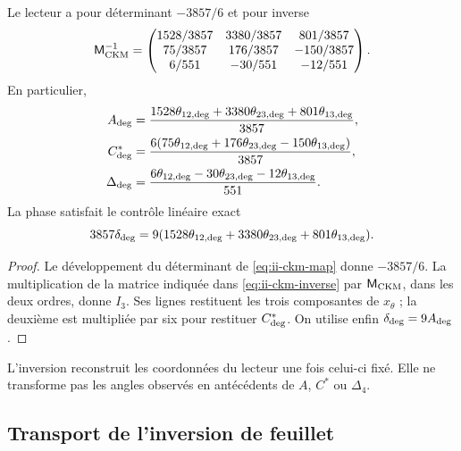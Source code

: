 \begin{proposition}
Le lecteur a pour déterminant \(-3857/6\) et pour inverse
\begin{equation}
 \mathsf M_{\rm CKM}^{-1}=
 \begin{pmatrix}
 1528/3857&3380/3857&801/3857\\
 75/3857&176/3857&-150/3857\\
 6/551&-30/551&-12/551
 \end{pmatrix}.
 \label{eq:ii-ckm-inverse}
\end{equation}
En particulier,
\begin{align}
 A_{\rm deg}
 &=\frac{1528\theta_{12,\rm deg}+3380\theta_{23,\rm deg}
          +801\theta_{13,\rm deg}}{3857},\nonumber\\
 C^*_{\rm deg}
 &=\frac{6(75\theta_{12,\rm deg}+176\theta_{23,\rm deg}
          -150\theta_{13,\rm deg})}{3857},\nonumber\\
 \Delta_{\rm deg}
 &=\frac{6\theta_{12,\rm deg}-30\theta_{23,\rm deg}
          -12\theta_{13,\rm deg}}{551}.
 \label{eq:ii-ckm-recover}
\end{align}
La phase satisfait le contrôle linéaire exact
\begin{equation}
 3857\delta_{\rm deg}
 =9(1528\theta_{12,\rm deg}+3380\theta_{23,\rm deg}
      +801\theta_{13,\rm deg}).
 \label{eq:ii-ckm-phase-check}
\end{equation}
\end{proposition}

\begin{proof}
Le développement du déterminant de \eqref{eq:ii-ckm-map} donne
\(-3857/6\). La multiplication de la matrice indiquée dans
\eqref{eq:ii-ckm-inverse} par \(\mathsf M_{\rm CKM}\), dans les deux
ordres, donne \(I_3\). Ses lignes restituent les trois composantes de
\(x_\theta\) ; la deuxième est multipliée par six pour restituer
\(C^*_{\rm deg}\). On utilise enfin
\(\delta_{\rm deg}=9A_{\rm deg}\).
\end{proof}

L'inversion reconstruit les coordonnées du lecteur une fois celui-ci fixé. Elle ne
transforme pas les angles observés en antécédents de \(A\), \(C^*\) ou
\(\Delta_4\).



\subsection{Transport de l'inversion de feuillet}

